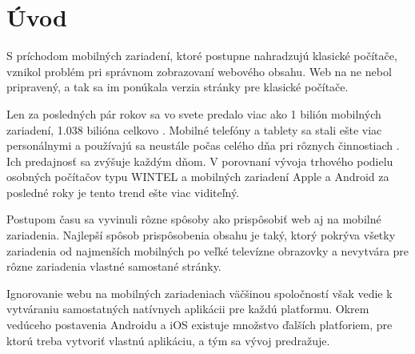 \section{Úvod} %
\label{sec:_vod}



S príchodom mobilných zariadení, ktoré postupne nahradzujú klasické počítače, vznikol problém pri správnom zobrazovaní webového obsahu. Web na ne nebol pripravený, a tak sa im ponúkala verzia stránky pre klasické počítače.

Len za posledných pár rokov sa vo svete predalo viac ako 1 bilión mobilných zariadení, 1.038 bilióna celkovo \cite{bilion}. Mobilné telefóny a tablety sa stali ešte viac personálnymi a používajú sa neustále počas celého dňa pri rôznych činnostiach \cite{mobileuse, smarthopenseveryday, tabletuse}. Ich predajnosť sa zvýšuje každým dňom. V porovnaní vývoja trhového podielu osobných počítačov typu WINTEL a mobilných zariadení Apple a Android za posledné roky je tento trend ešte viac viditeľný.

Postupom času sa vyvinuli rôzne spôsoby ako prispôsobiť web aj na mobilné zariadenia. Najlepší spôsob prispôsobenia obsahu je taký, ktorý pokrýva všetky zariadenia od najmenších mobilných po veľké televízne obrazovky a nevytvára pre rôzne zariadenia vlastné samostané stránky.

Ignorovanie webu na mobilných zariadeniach väčšinou spoločností však vedie k vytváraniu samostatných natívnych aplikácii pre každú platformu. Okrem vedúceho postavenia Androidu a iOS existuje množstvo ďalších platforiem, pre ktorú treba vytvoriť vlastnú aplikáciu, a tým sa vývoj predražuje.

